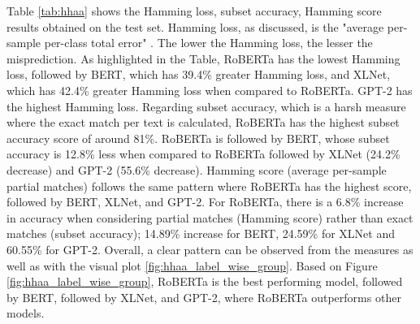 Table \ref{tab:hhaa} shows the Hamming loss, subset accuracy, Hamming score results obtained on the test set. Hamming loss, as discussed, is the "average per-sample per-class total error" \cite{sokolova2009systematic}. The lower the Hamming loss, the lesser the misprediction. As highlighted in the Table, RoBERTa has the lowest Hamming loss, followed by BERT, which has 39.4\% greater Hamming loss, and XLNet, which has 42.4\% greater Hamming loss when compared to RoBERTa. GPT-2 has the highest Hamming loss. Regarding subset accuracy, which is a harsh measure where the exact match per text is calculated, RoBERTa has the highest subset accuracy score of around 81\%. RoBERTa is followed by BERT, whose subset accuracy is 12.8\% less when compared to RoBERTa followed by XLNet (24.2\% decrease) and GPT-2 (55.6\% decrease). Hamming score (average per-sample partial matches) follows the same pattern where RoBERTa has the highest score, followed by BERT, XLNet, and GPT-2. For RoBERTa, there is a 6.8\% increase in accuracy when considering partial matches (Hamming score) rather than exact matches (subset accuracy); 14.89\% increase for BERT, 24.59\% for XLNet and 60.55\% for GPT-2.
Overall, a clear pattern can be observed from the measures as well as with the visual plot \ref{fig:hhaa_label_wise_group}. Based on Figure  \ref{fig:hhaa_label_wise_group}, RoBERTa is the best performing model, followed by BERT, followed by XLNet, and GPT-2, where RoBERTa outperforms other models.


